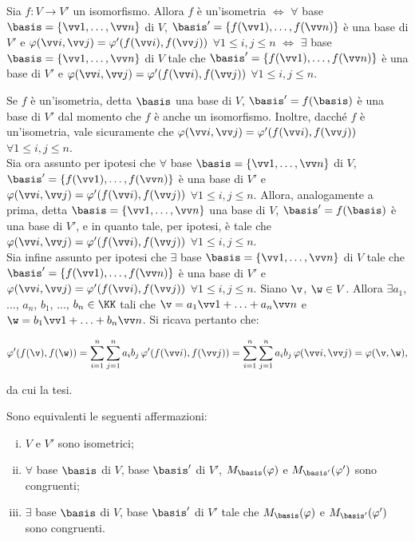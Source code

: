 \documentclass[11pt]{article}
\begin{document}
	\begin{exercise} Sia $f : V \to V'$ un isomorfismo. Allora $f$ è un'isometria $\iff$ $\forall$ base $\basis = \{ \vv 1, \ldots, \vv n \}$ di $V$, $\basis' = \{ f(\vv 1), \ldots, f(\vv n) \}$ è una base di $V'$ e $\varphi(\vv i, \vv j) = \varphi'(f(\vv i), f(\vv j))$ $\forall 1 \leq i, j \leq n$ $\iff$ $\exists$ base $\basis = \{ \vv 1, \ldots, \vv n \}$ di $V$ tale che $\basis' = \{ f(\vv 1), \ldots, f(\vv n) \}$ è una base di $V'$ e $\varphi(\vv i, \vv j) = \varphi'(f(\vv i), f(\vv j))$ $\forall 1 \leq i, j \leq n$.
	\end{exercise}

	\begin{solution} Se $f$ è un'isometria, detta $\basis$ una base di $V$, $\basis' = f(\basis)$ è una base di $V'$
		dal momento che $f$ è anche un isomorfismo. Inoltre, dacché $f$ è un'isometria, vale sicuramente che
		$\varphi(\vv i, \vv j) = \varphi'(f(\vv i), f(\vv j))$ $\forall 1 \leq i, j \leq n$. \\
		
		Sia ora assunto per ipotesi che $\forall$ base $\basis = \{ \vv 1, \ldots, \vv n \}$ di $V$, $\basis' = \{ f(\vv 1), \ldots, f(\vv n) \}$ è una base di $V'$ e $\varphi(\vv i, \vv j) = \varphi'(f(\vv i), f(\vv j))$ $\forall 1 \leq i, j \leq n$. Allora, analogamente a prima, detta $\basis = \{ \vv 1, \ldots, \vv n \}$ una base di $V$, $\basis' = f(\basis)$ è una base di $V'$, e in quanto tale,
		per ipotesi, è tale che $\varphi(\vv i, \vv j) = \varphi'(f(\vv i), f(\vv j))$ $\forall 1 \leq i, j \leq n$. \\
		
		Sia infine assunto per ipotesi che $\exists$ base $\basis = \{ \vv 1, \ldots, \vv n \}$ di $V$ tale che $\basis' = \{ f(\vv 1), \ldots, f(\vv n) \}$ è una base di $V'$ e $\varphi(\vv i, \vv j) = \varphi'(f(\vv i), f(\vv j))$ $\forall 1 \leq i, j \leq n$. Siano $\v$, $\w \in V$. Allora $\exists a_1$, ..., $a_n$, $b_1$, ..., $b_n \in \KK$
		tali che $\v = a_1 \vv 1 + \ldots + a_n \vv n$ e $\w = b_1 \vv 1 + \ldots + b_n \vv n$. Si ricava pertanto
		che:
		
		\[ \varphi'(f(\v), f(\w)) = \sum_{i=1}^n \sum_{j=1}^n a_i b_j \, \varphi'(f(\vv i), f(\vv j)) =
		\sum_{i=1}^n \sum_{j=1}^n a_i b_j \, \varphi(\vv i, \vv j) = \varphi(\v, \w), \]
		
		da cui la tesi.
	\end{solution}

	\begin{proposition} Sono equivalenti le seguenti affermazioni:
		
		\begin{enumerate}[(i)]
			\item $V$ e $V'$ sono isometrici;
			\item $\forall$ base $\basis$ di $V$, base $\basis'$ di $V'$,
			$M_\basis(\varphi)$ e $M_{\basis'}(\varphi')$ sono congruenti;
			\item $\exists$ base $\basis$ di $V$, base $\basis'$ di $V'$ tale che
			$M_\basis(\varphi)$ e $M_{\basis'}(\varphi')$ sono congruenti.
		\end{enumerate}
	\end{proposition}
\end{document}
